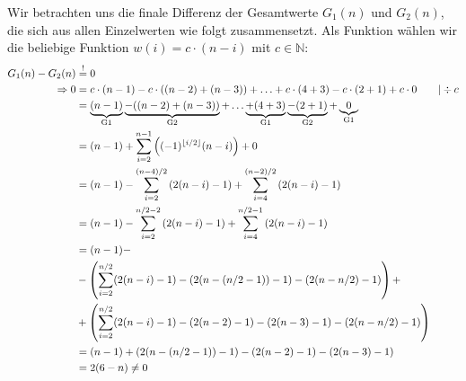 \documentclass{article}
\DeclarePairedDelimiter\floor{\lfloor}{\rfloor}
\begin{document}
\begin{enumerate}
        Wir betrachten uns die finale Differenz der Gesamtwerte $G_1(n)$ und $G_2(n)$, die sich aus allen Einzelwerten wie folgt zusammensetzt. Als Funktion wählen wir die beliebige Funktion $w(i) = c\cdot (n-i)$ mit $c \in \mathbb{N}$:
        \begin{align*}
            G_1(n) - G_2(n) &\stackrel{!}{=}0 \\
            \Rightarrow 0 &= c \cdot (n-1) - c \cdot ((n-2) + (n-3)) + \ldots + c \cdot (4+  3)- c \cdot (2 + 1) + c \cdot 0 \qquad | \div c \\
            &= \underbrace{(n-1)}_{\text{G1}} \underbrace{- ((n-2) + (n-3))}_{\text{G2}} + \ldots \underbrace{+(4+3)}_{\text{G1}} \underbrace{- (2 + 1)}_{\text{G2}} + \underbrace{0}_{\text{G1}}  \\
            &= (n-1) + \sum_{i=2}^{n-1} \left( (-1)^{\floor{i/2}} (n-i)\right) + 0 \\
            &= (n-1) - \sum_{i=2}^{(n-4)/2} \left( 2(n-i)-1 \right) + \sum_{i=4}^{(n-2)/2} \left( 2(n-i) -1 \right) \\
            &= (n-1) - \sum_{i=2}^{n/2-2} \left( 2(n-i)-1 \right) + \sum_{i=4}^{n/2-1} \left( 2(n-i) -1 \right) \\
            &= (n-1) - \\
            &-\left(\sum_{i=2}^{n/2} ( 2(n-i)-1) - (2(n-(n/2-1)) -1) - (2(n-n/2)-1)\right) + \\
            &+\left(\sum_{i=2}^{n/2} ( 2(n-i)-1) - (2(n-2)-1) - (2(n-3)-1) - (2(n-n/2)-1)\right) \\
            &= (n-1) + (2(n-(n/2-1)) -1) - (2(n-2)-1) - (2(n-3)-1) \\
            &= 2(6-n) \neq 0
        \end{align*}
    \end{enumerate}
\end{document}

